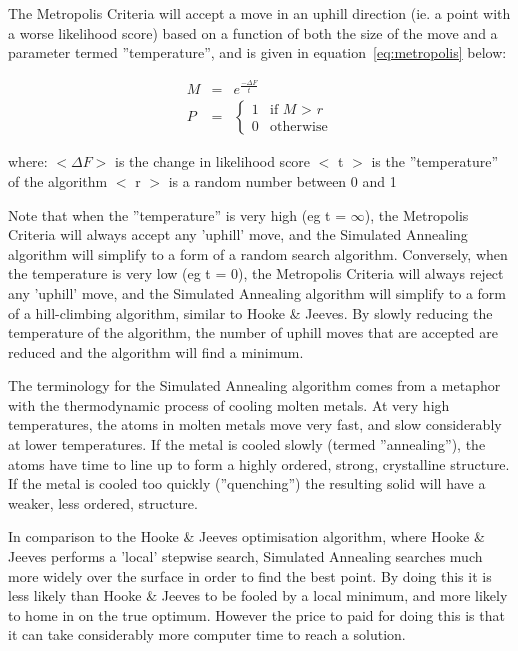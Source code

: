 \documentclass [a4paper, 10pt]{book}
\begin{document}
\bigskip
The Metropolis Criteria will accept a move in an uphill direction (ie. a point with a worse likelihood score) based on a function of both the size of the move and a parameter termed ''temperature'', and is given in equation~\ref{eq:metropolis} below:

\begin{eqnarray}\label{eq:metropolis}
M & = & e^{\displaystyle \frac{-\Delta F} {t}} \nonumber \\
P & = &
\begin{cases}
1 & \textrm{if $M$ > $r$} \\
0 & \textrm{otherwise}
\end{cases}
\end{eqnarray}

where:\newline
$<\Delta F>$ is the change in likelihood score\newline
$<$ t $>$ is the ''temperature'' of the algorithm\newline
$<$ r $>$ is a random number between 0 and 1

\bigskip
Note that when the ''temperature'' is very high (eg t = $\infty$), the Metropolis Criteria will always accept any 'uphill' move, and the Simulated Annealing algorithm will simplify to a form of a random search algorithm.  Conversely, when the temperature is very low (eg t = 0), the Metropolis Criteria will always reject any 'uphill' move, and the Simulated Annealing algorithm will simplify to a form of a hill-climbing algorithm, similar to Hooke \& Jeeves.  By slowly reducing the temperature of the algorithm, the number of uphill moves that are accepted are reduced and the algorithm will find a minimum.

\bigskip
The terminology for the Simulated Annealing algorithm comes from a metaphor with the thermodynamic process of cooling molten metals.  At very high temperatures, the atoms in molten metals move very fast, and slow considerably at lower temperatures.  If the metal is cooled slowly (termed ''annealing''), the atoms have time to line up to form a highly ordered, strong, crystalline structure.  If the metal is cooled too quickly (''quenching'') the resulting solid will have a weaker, less ordered, structure.

\bigskip
In comparison to the Hooke \& Jeeves optimisation algorithm, where Hooke \& Jeeves performs a 'local' stepwise search, Simulated Annealing searches much more widely over the surface in order to find the best point.  By doing this it is less likely than Hooke \& Jeeves to be fooled by a local minimum, and more likely to home in on the true optimum.  However the price to paid for doing this is that it can take considerably more computer time to reach a solution.
\end{document}

